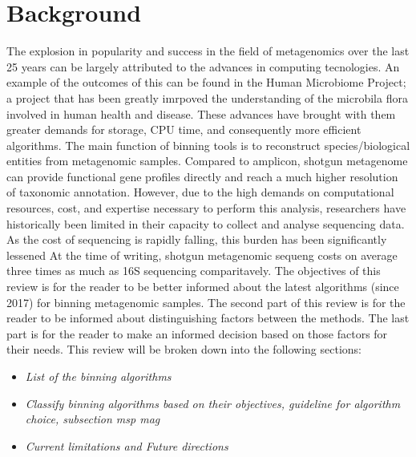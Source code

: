 \documentclass{article}
\begin{document}
\section*{Background}
The explosion in popularity and success in the field of metagenomics over the last 25 years can be largely attributed to the advances in computing tecnologies.
An example of the outcomes of this can be found in the Human Microbiome Project; a project that has been greatly imrpoved the understanding of the microbila flora involved in human health and disease.
These advances have brought with them greater demands for storage, CPU time, and consequently more efficient algorithms.
The main function of binning tools is to reconstruct species/biological entities from metagenomic samples.  
Compared to amplicon, shotgun metagenome can provide functional gene profiles directly and reach a much higher resolution of taxonomic annotation.
However, due to the high demands on computational resources, cost, and expertise necessary to perform this analysis, researchers have historically been limited in their capacity to collect and analyse sequencing data.
As the cost of sequencing is rapidly falling, this burden has been significantly lessened
At the time of writing, shotgun metagenomic sequeng costs on average three times as much as 16S sequencing comparitavely.
The objectives of this review is for the reader to be better informed about the latest algorithms (since 2017) for binning metagenomic samples.
The second part of this review is for the reader to be informed about distinguishing factors between the methods.
The last part is for the reader to make an informed decision based on those factors for their needs.
This review will be broken down into the following sections:
\begin{itemize}
	\item \emph{List of the binning algorithms}
	\item \emph{Classify binning algorithms based on their objectives, guideline for algorithm choice, subsection msp mag }
	\item \emph{Current limitations and Future directions}
\end{itemize}
\end{document}
